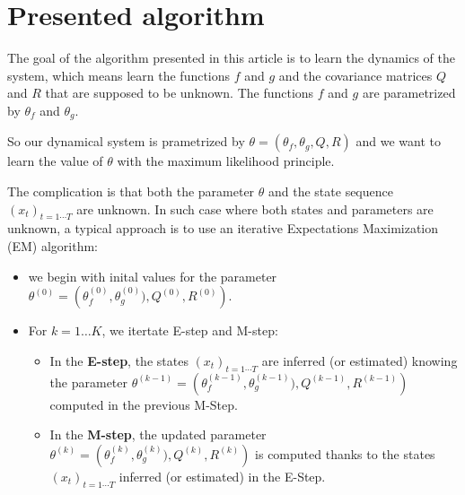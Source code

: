 \section{Presented algorithm}

The goal of the algorithm presented in this article is to learn the dynamics of the system, which means learn the functions $f$ and $g$  and the covariance matrices $Q$ and $R$ that are supposed to be unknown.
The functions $f$ and $g$ are parametrized by $\theta_f$ and $\theta_g$.

So our dynamical system is prametrized by $\theta = \left(\theta_f, \theta_g, Q, R \right)$ and we want to learn the value of $\theta$ with the maximum likelihood principle.

The complication is that both the parameter $\theta$ and the state sequence $(x_t)_{t=1 \cdots T}$ are unknown.
In such case where both states and parameters are unknown, a typical approach is to use an iterative Expectations Maximization (EM) algorithm:
\begin{itemize}
  \item we begin with inital values for the parameter $\theta^{(0)} = \left( \theta_f^{(0)}, \theta_g^{(0)}), Q^{(0)}, R^{(0)} \right)$.
\item For $k=1 \ldots K$, we itertate E-step and M-step:
  \begin{itemize}
    \item In the \textbf{E-step}, the states $(x_t)_{t=1 \cdots T}$ are inferred (or estimated) knowing the parameter $\theta^{(k-1)} = \left( \theta_f^{(k-1)}, \theta_g^{(k-1)}), Q^{(k-1)}, R^{(k-1)} \right)$ computed in the previous M-Step.
    \item In the \textbf{M-step}, the updated parameter $\theta^{(k)} = \left( \theta_f^{(k)}, \theta_g^{(k)}), Q^{(k)}, R^{(k)} \right)$ is computed thanks to the states $(x_t)_{t=1 \cdots T}$ inferred (or estimated) in the E-Step.
  \end{itemize}
\end{itemize}
